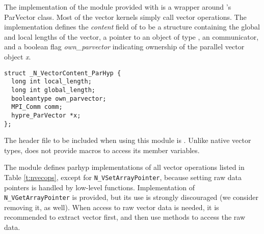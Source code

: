%
The {\nvecph} implementation of the {\nvector} module provided with
{\sundials} is a wrapper around {\hypre}'s ParVector class. 
Most of the vector kernels simply call {\hypre} vector operations. 
The implementation defines the {\em content} field of  to 
be a structure containing the global and local lengths of the vector, a 
pointer to an object of type , an {\mpi} communicator, 
and a boolean flag {\em own\_parvector} indicating ownership of the
{\hypre} parallel vector object {\em x}.
\begin{verbatim}
struct _N_VectorContent_ParHyp {
  long int local_length;
  long int global_length;
  booleantype own_parvector;
  MPI_Comm comm;
  hypre_ParVector *x;
};
\end{verbatim}

\noindent
The header file to be included when using this module is .
Unlike native {\sundials} vector types, {\nvecph} does not provide macros 
to access its member variables.

The {\nvecph} module defines parhyp implementations of all vector operations listed 
in Table \ref{t:nvecops}, except for \verb|N_VSetArrayPointer|, because setting raw 
data pointers is handled by low-level {\hypre} functions. Implementation of 
\verb|N_VGetArrayPointer| is provided, but its use is strongly discouraged (we 
consider removing it, as well). When access to raw vector data is needed, it is 
recommended to extract {\hypre} vector first, and then use {\hypre} 
methods to access the raw data. 

